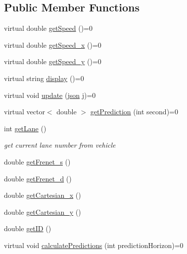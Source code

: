 \subsection*{Public Member Functions}
\begin{DoxyCompactItemize}
\item 
virtual double \hyperlink{classAbstractVehicle_a17c193d56e1da24a1008ae52859d31c7}{get\+Speed} ()=0
\item 
virtual double \hyperlink{classAbstractVehicle_abe9a9f5e2290fdf4207ac0206b9e97a3}{get\+Speed\+\_\+x} ()=0
\item 
virtual double \hyperlink{classAbstractVehicle_a90e6e4299070bace1acfd8d79bf78c95}{get\+Speed\+\_\+y} ()=0
\item 
virtual string \hyperlink{classAbstractVehicle_ada311ec475179ba776966f7e3ddcb91a}{display} ()=0
\item 
virtual void \hyperlink{classAbstractVehicle_a004b43b4a4d02ca6122ed8862c672de3}{update} (\hyperlink{main_8cpp_ab701e3ac61a85b337ec5c1abaad6742d}{json} j)=0
\item 
virtual vector$<$ double $>$ \hyperlink{classAbstractVehicle_a3c84d6970c9461bfafd76cf48d6bece0}{get\+Prediction} (int second)=0
\item 
int \hyperlink{classAbstractVehicle_aad5abe9ab0ba30d7a1e217408e7e9baa}{get\+Lane} ()
\begin{DoxyCompactList}\small\item\em get current lane number from vehicle \end{DoxyCompactList}\item 
double \hyperlink{classAbstractVehicle_a54d4973b14dbd842ec68fdce2b5950b8}{get\+Frenet\+\_\+s} ()
\item 
double \hyperlink{classAbstractVehicle_a2551fc01117e71f4a1d9c799f2ea2875}{get\+Frenet\+\_\+d} ()
\item 
double \hyperlink{classAbstractVehicle_a68789bdcd4abe63bde21ea2587a2ca0a}{get\+Cartesian\+\_\+x} ()
\item 
double \hyperlink{classAbstractVehicle_ab3415d624ff40a27fd709bd87560d2ac}{get\+Cartesian\+\_\+y} ()
\item 
double \hyperlink{classAbstractVehicle_ab334fb8d15fd2ea52abd255924bb4c15}{get\+ID} ()
\item 
virtual void \hyperlink{classAbstractVehicle_a631115b44756050ccf2a7fe975787035}{calculate\+Predictions} (int prediction\+Horizon)=0
\end{DoxyCompactItemize}
